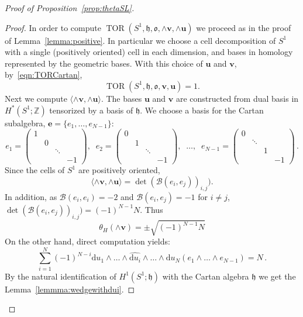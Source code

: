 \documentclass[11pt]{article}
\theoremstyle{definition}
\numberwithin{equation}{section}
\numberwithin{figure}{section}
\numberwithin{table}{section}
\DeclareMathOperator{\TOR}{TOR}
\newcommand{\Bcal}{\mathcal{B}}
\newcommand{\Zbb}{\mathbb{Z}}
\newcommand{\ofrk}{\mathfrak{o}}
\newcommand{\hfrk}{\mathfrak{h}}
\newcommand{\ubf}{\mathbf{u}}
\newcommand{\vbf}{\mathbf{v}}
\newcommand{\ebf}{\mathbf{e}}
\newcommand*{\dd}{\mathrm{d}}
\begin{document}
\begin{proof}[Proof of Proposition~\ref{prop:thetaSL}]
\begin{proof}
In order to compute $\TOR(S^1,\hfrk,\ofrk,\wedge\vbf,\wedge\ubf)$ we proceed as in the proof of Lemma~\ref{lemma:positive}. In particular we choose a cell decomposition of $S^1$ with a single (positively oriented) cell in each dimension, and bases in homology represented by the geometric bases. With this choice of $\ubf$ and $\vbf$, by~\eqref{eqn:TORCartan},
\[
\TOR(S^1,\hfrk, \ofrk, \vbf,\ubf)=1.
\]
Next we compute $ \langle \wedge\vbf,\wedge\ubf\rangle $. The bases $\ubf$ and $\vbf$ are constructed from dual basis in $H^*(S^1;\Zbb)$ tensorized by a basis of $\hfrk$. We choose a basis for the Cartan subalgebra, $\ebf=\{e_1,\dots, e_{N-1}\}$:
\[
e_1=
\begin{pmatrix}
1 & & & \\
& 0 & & \\
& & \ddots & \\
& & & - 1
\end{pmatrix},\;\; e_2=
\begin{pmatrix}
0 & & & \\
& 1 & & \\
& & \ddots & \\
& & & - 1
\end{pmatrix},\;\;\dots,\;\; e_{N-1}=
\begin{pmatrix}
0 & & & \\
& \ddots & & \\
& & 1 & \\
& & & - 1
\end{pmatrix} \,.
\]
Since the cells of $S^1$ are positively oriented,
\[
\langle \wedge \vbf, \wedge\ubf\rangle= \det(\Bcal(e_i,e_j))_{i,j}).
\]
In addition, as $\Bcal(e_i,e_i)=-2$ and $\Bcal(e_i,e_j)= -1$ for $i\neq j$, $\det(\Bcal(e_i,e_j))_{i,j}) = (-1)^{N-1} N $. Thus
\begin{equation}\label{eqn:omegahv}
\theta_H(\wedge \vbf)= \pm \sqrt{ (-1)^{N-1} N }
\end{equation}
On the other hand, direct computation yields:
\[
\sum_{i=1}^N (-1)^{N-i}\dd u_1\wedge\dots\wedge \widehat{\dd u_i}\wedge \dots\wedge \dd u_N (e_1\wedge\dots\wedge e_{N-1})=N\,.
\]
By the natural identification of $H^1(S^1;\hfrk)$ with the Cartan algebra $\hfrk$ we get the Lemma~\ref{lemmma:wedgewithdui}.
\end{proof}


\end{proof}
\end{document}
